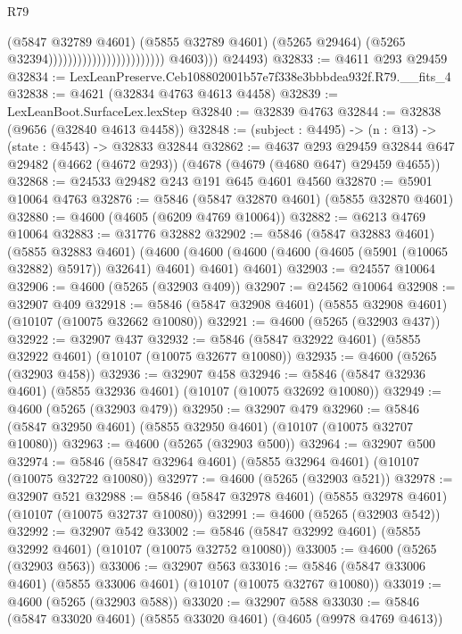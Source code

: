 \begin{lexlean}{R79}
\begin{coremodule}
                                                          (@5847 @32789 @4601)
                                                          (@5855 @32789 @4601)
                                                          (@5265 @29464)
                                                          (@5265 @32394))))))))))))))))))))))))
            @4603)))
      @24493)
@32833 := @4611 @293 @29459
@32834 := LexLeanPreserve.Ceb108802001b57e7f338e3bbbdea932f.R79.__fits_4
@32838 := @4621 (@32834 @4763 @4613 @4458)
@32839 := LexLeanBoot.SurfaceLex.lexStep
@32840 := @32839 @4763
@32844 := @32838 (@9656 (@32840 @4613 @4458))
@32848 := (subject : @4495) -> (n : @13) -> (state : @4543) -> @32833 @32844
@32862 := @4637
    @293
    @29459
    @32844
    @647
    @29482
    (@4662 (@4672 @293))
    (@4678 (@4679 (@4680 @647) @29459 @4655))
@32868 := @24533 @29482 @243 @191 @645 @4601 @4560
@32870 := @5901 @10064 @4763
@32876 := @5846 (@5847 @32870 @4601) (@5855 @32870 @4601)
@32880 := @4600 (@4605 (@6209 @4769 @10064))
@32882 := @6213 @4769 @10064
@32883 := @31776 @32882
@32902 := @5846
    (@5847 @32883 @4601)
    (@5855 @32883 @4601)
    (@4600 (@4600 (@4600 (@4600 (@4605 (@5901 (@10065 @32882) @5917)) @32641) @4601) @4601) @4601)
@32903 := @24557 @10064
@32906 := @4600 (@5265 (@32903 @409))
@32907 := @24562 @10064
@32908 := @32907 @409
@32918 := @5846 (@5847 @32908 @4601) (@5855 @32908 @4601) (@10107 (@10075 @32662 @10080))
@32921 := @4600 (@5265 (@32903 @437))
@32922 := @32907 @437
@32932 := @5846 (@5847 @32922 @4601) (@5855 @32922 @4601) (@10107 (@10075 @32677 @10080))
@32935 := @4600 (@5265 (@32903 @458))
@32936 := @32907 @458
@32946 := @5846 (@5847 @32936 @4601) (@5855 @32936 @4601) (@10107 (@10075 @32692 @10080))
@32949 := @4600 (@5265 (@32903 @479))
@32950 := @32907 @479
@32960 := @5846 (@5847 @32950 @4601) (@5855 @32950 @4601) (@10107 (@10075 @32707 @10080))
@32963 := @4600 (@5265 (@32903 @500))
@32964 := @32907 @500
@32974 := @5846 (@5847 @32964 @4601) (@5855 @32964 @4601) (@10107 (@10075 @32722 @10080))
@32977 := @4600 (@5265 (@32903 @521))
@32978 := @32907 @521
@32988 := @5846 (@5847 @32978 @4601) (@5855 @32978 @4601) (@10107 (@10075 @32737 @10080))
@32991 := @4600 (@5265 (@32903 @542))
@32992 := @32907 @542
@33002 := @5846 (@5847 @32992 @4601) (@5855 @32992 @4601) (@10107 (@10075 @32752 @10080))
@33005 := @4600 (@5265 (@32903 @563))
@33006 := @32907 @563
@33016 := @5846 (@5847 @33006 @4601) (@5855 @33006 @4601) (@10107 (@10075 @32767 @10080))
@33019 := @4600 (@5265 (@32903 @588))
@33020 := @32907 @588
@33030 := @5846 (@5847 @33020 @4601) (@5855 @33020 @4601) (@4605 (@9978 @4769 @4613))

\end{coremodule}
\end{lexlean}
